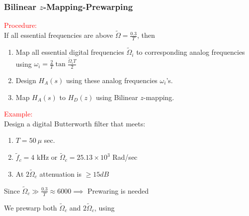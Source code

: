\documentclass[mathserif, 10pt]{beamer} %
\begin{document}
\frame
{
\small
\frametitle{Bilinear $z$-Mapping-Prewarping}
\textcolor{red}{Procedure:}\\

If all essential frequencies  are above $\tilde \Omega = \frac{0.3}{T}$, then \\ \vspace{.05in}
\begin{enumerate}
	\item Map all essential digital frequencies $\tilde \Omega_i$ to corresponding analog frequencies using
	$\omega_i = \frac{2}{T} \tan \frac{\tilde \Omega_i T}{2}$
	\item Design $H_A(s)$ using these analog frequencies $\omega_i$'s.
 \item Map $H_A(s)$ to $H_D(z)$ using Bilinear $z$-mapping. \vspace{.1in}
\end{enumerate}

\textcolor{red}{Example:}\\ \vspace{.05in}
Design a digital Butterworth filter that meets:
\begin{enumerate}
	\item $T=50~\mu$ sec.
	\item $\tilde f_c = 4$ kHz or $\tilde \Omega_c = 25.13 \times 10^3$ Rad/sec
	\item At $2 \tilde\Omega_c$ attenuation is $\ge 15dB$
\end{enumerate}

Since $\tilde \Omega_c \gg \frac{0.3}{T} \approx 6000 \implies$ Prewaring is needed\\ \vspace{.05in}

We prewarp both $\tilde{\Omega}_c$ and $2 \tilde\Omega_c$, using
}
\end{document}
